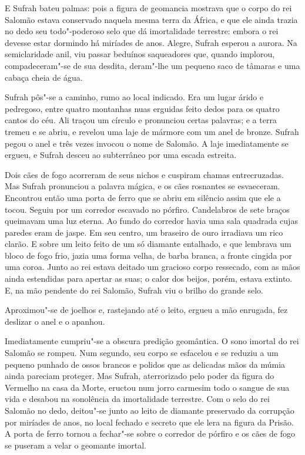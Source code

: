 E Sufrah bateu palmas: pois a figura de geomancia mostrava que o corpo do
rei Salomão estava conservado naquela mesma terra da África, e que ele
ainda trazia no dedo seu todo"-poderoso selo que dá imortalidade terrestre:
embora o rei devesse estar dormindo há miríades de anos. Alegre, Sufrah
esperou a aurora. Na semiclaridade anil, viu passar beduínos saqueadores
que, quando implorou, compadeceram"-se de sua desdita, deram"-lhe um pequeno
saco de tâmaras e uma cabaça cheia de água.

Sufrah pôs"-se a caminho, rumo ao local indicado. Era um lugar árido e
pedregoso, entre quatro montanhas nuas erguidas feito dedos para os quatro
cantos do céu. Ali traçou um círculo e pronunciou certas palavras; e a
terra tremeu e se abriu, e revelou uma laje de mármore com um anel de
bronze. Sufrah pegou o anel e três vezes invocou o nome de Salomão. A laje
imediatamente se ergueu, e Sufrah desceu ao subterrâneo por uma escada
estreita.

Dois cães de fogo acorreram de seus nichos e cuspiram chamas entrecruzadas.
Mas Sufrah pronunciou a palavra mágica, e os cães rosnantes se esvaeceram.
Encontrou então uma porta de ferro que se abriu em silêncio assim que ele
a tocou. Seguiu por um corredor escavado no pórfiro. Candelabros de sete
braços queimavam uma luz eterna. Ao fundo do corredor havia uma sala
quadrada cujas paredes eram de jaspe. Em seu centro, um braseiro de ouro
irradiava um rico clarão. E sobre um leito feito de um só diamante
entalhado, e que lembrava um bloco de fogo frio, jazia uma forma velha, de
barba branca, a fronte cingida por uma coroa. Junto ao rei estava deitado
um gracioso corpo ressecado, com as mãos ainda estendidas para apertar as
suas; o calor dos beijos, porém, estava extinto. E, na mão pendente do rei
Salomão, Sufrah viu o brilho do grande selo.

Aproximou"-se de joelhos e, rastejando até o leito, ergueu a mão enrugada,
fez deslizar o anel e o apanhou. 

Imediatamente cumpriu"-se a obscura predição geomântica. O sono imortal do
rei Salomão se rompeu. Num segundo, seu corpo se esfacelou e se reduziu a
um pequeno punhado de ossos brancos e polidos que as delicadas mãos da
múmia ainda pareciam proteger. Mas Sufrah, aterrorizado pelo poder da
figura do Vermelho na casa da Morte, eructou num jorro carmesim todo o
sangue de sua vida e desabou na sonolência da imortalidade terrestre. Com
o selo do rei Salomão no dedo, deitou"-se junto ao leito de diamante
preservado da corrupção por miríades de anos, no local fechado e secreto
que ele lera na figura da Prisão. A porta de ferro tornou a fechar"-se
sobre o corredor de pórfiro e os cães de fogo se puseram a velar o
geomante imortal.

